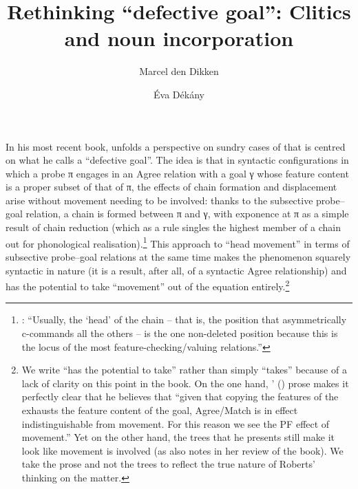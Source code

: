 \documentclass[output=paper]{langsci/langscibook}
\author{Marcel den Dikken\affiliation{Eötvös University and RIL HAS}\and
Éva Dékány\affiliation{RIL HAS}}
\title{Rethinking ``defective goal'': Clitics and noun incorporation}
\begin{document}
\glsresetall
\begin{refcontext}

In his most recent book, \cite{Roberts2010} unfolds a perspective on sundry cases
of  that is centred on what he calls a \enquote{defective goal}.
The idea is that in syntactic configurations in which a probe π engages in
an Agree relation with a goal γ whose feature content is a proper subset
of that of π, the effects of chain formation and displacement arise without
movement needing to be involved: thanks to the subsective probe--goal relation,
a chain is formed between π and γ, with exponence at π as a
simple result of chain reduction (which as a rule singles the highest member of
a chain out for phonological realisation).\footnote{\citet[61]{Roberts2010}:
    \enquote{Usually, the \enquote{head} of the chain -- that is, the
        position that asymmetrically c-commands all the others -- is the one
        non-deleted position because this is the locus of the most
        feature-checking/valuing relations.}} This approach to \enquote{head
    movement} in terms of subsective probe–goal relations at the same time
    makes the phenomenon squarely syntactic in nature (it is a result, after
    all, of a syntactic Agree relationship) and has the potential to take
    \enquote{movement} out of the equation entirely.\footnote{We write
        \enquote{has the potential to take} rather than simply
        \enquote{takes} because of a lack of clarity on this point in the
        book. On the one hand, \citeauthor{Roberts2010}'
        (\citeyear[160]{Roberts2010}) prose makes it perfectly clear that he
        believes that \enquote{given that copying the features of the
             exhausts the feature content of the goal,
        Agree/Match is in effect indistinguishable from movement. For this
    reason we see the PF effect of movement.} Yet on the other hand, the trees
    that he presents still make it look like movement is involved (as
    \citealt{matushanskyrobertsreview} also notes in her review of the book).
    We take the prose and not the trees to reflect the true nature of Roberts’
thinking on the matter.}


\end{refcontext}
\end{document}
